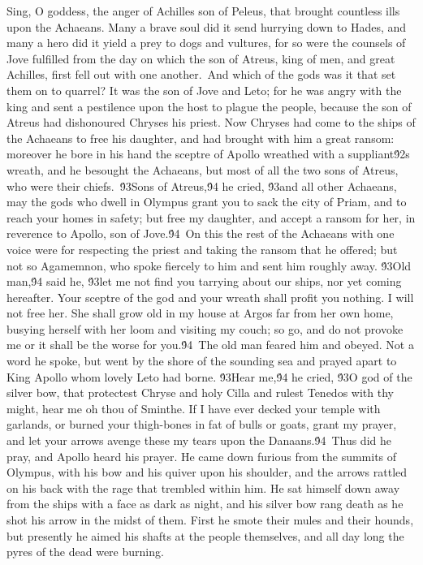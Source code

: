 {  Sing, O goddess, the anger of Achilles son of Peleus, that brought countless ills upon the Achaeans. Many a brave soul did it send hurrying down to Hades, and many a hero did it yield a prey to dogs and vultures, for so were the counsels of Jove fulfilled from the day on which the son of Atreus, king of men, and great Achilles, first fell out with one another.\
And which of the gods was it that set them on to quarrel? It was the son of Jove and Leto; for he was angry with the king and sent a pestilence upon the host to plague the people, because the son of Atreus had dishonoured Chryses his priest. Now Chryses had come to the ships of the Achaeans to free his daughter, and had brought with him a great ransom: moreover he bore in his hand the sceptre of Apollo wreathed with a suppliant\'92s wreath, and he besought the Achaeans, but most of all the two sons of Atreus, who were their chiefs.\
\'93Sons of Atreus,\'94 he cried, \'93and all other Achaeans, may the gods who dwell in Olympus grant you to sack the city of Priam, and to reach your homes in safety; but free my daughter, and accept a ransom for her, in reverence to Apollo, son of Jove.\'94\
On this the rest of the Achaeans with one voice were for respecting the priest and taking the ransom that he offered; but not so Agamemnon, who spoke fiercely to him and sent him roughly away. \'93Old man,\'94 said he, \'93let me not find you tarrying about our ships, nor yet coming hereafter. Your sceptre of the god and your wreath shall profit you nothing. I will not free her. She shall grow old in my house at Argos far from her own home, busying herself with her loom and visiting my couch; so go, and do not provoke me or it shall be the worse for you.\'94\
The old man feared him and obeyed. Not a word he spoke, but went by the shore of the sounding sea and prayed apart to King Apollo whom lovely Leto had borne. \'93Hear me,\'94 he cried, \'93O god of the silver bow, that protectest Chryse and holy Cilla and rulest Tenedos with thy might, hear me oh thou of Sminthe. If I have ever decked your temple with garlands, or burned your thigh-bones in fat of bulls or goats, grant my prayer, and let your arrows avenge these my tears upon the Danaans.\'94\
Thus did he pray, and Apollo heard his prayer. He came down furious from the summits of Olympus, with his bow and his quiver upon his shoulder, and the arrows rattled on his back with the rage that trembled within him. He sat himself down away from the ships with a face as dark as night, and his silver bow rang death as he shot his arrow in the midst of them. First he smote their mules and their hounds, but presently he aimed his shafts at the people themselves, and all day long the pyres of the dead were burning.\
}

